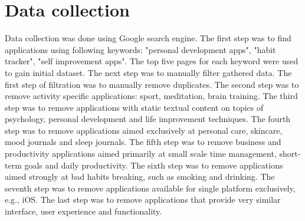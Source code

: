 
\section{Data collection}\label{sec:data-collection}

Data collection was done using Google search engine.
The first step was to find applications using following keywords: "personal development apps", "habit tracker", "self improvement apps".
The top five pages for each keyword were used to gain initial dataset.
The next step was to manually filter gathered data.
The first step of filtration was to manually remove duplicates.
The second step was to remove activity specific applications: sport, meditation, brain training.
The third step was to remove applications with static textual content on topics of psychology, personal development and life improvement techniques.
The fourth step was to remove applications aimed exclusively at personal care, skincare, mood journals and sleep journals.
The fifth step was to remove business and productivity applications aimed primarily at small scale time management, short-term goals and daily productivity.
The sixth step was to remove applications aimed strongly at bad habits breaking, such as smoking and drinking.
The seventh step was to remove applications available for single platform exclusively, e.g., iOS\@.
The last step was to remove applications that provide very similar interface, user experience and functionality.


